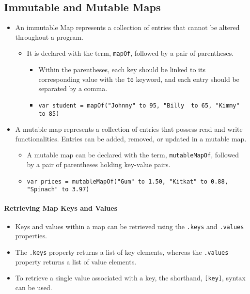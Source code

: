 \subsection{Immutable and Mutable Maps}
\begin{itemize}
    \item An immutable Map represents a collection of entries that cannot be altered throughout a program.
          \begin{itemize}
              \item It is declared with the term, \verb!mapOf!, followed by a pair of parentheses.
                    \begin{itemize}
                        \item Within the parentheses, each key should be linked to its corresponding value with the
                              \verb!to! keyword, and each entry should be separated by a comma.
                        \item \verb!var student = mapOf("Johnny" to 95, "Billy  to 65, "Kimmy" to 85)!
                    \end{itemize}
          \end{itemize}
\end{itemize}

\begin{itemize}
    \item A mutable map represents a collection of entries that possess read and write functionalities. 
    Entries can be added, removed, or updated in a mutable map.
    \begin{itemize}
        \item A mutable map can be declared with the term, \verb!mutableMapOf!, 
        followed by a pair of parentheses holding key-value pairs.
        \item \verb!var prices = mutableMapOf("Gum" to 1.50, "Kitkat" to 0.88, "Spinach" to 3.97)!
    \end{itemize}
\end{itemize}

\paragraph{Retrieving Map Keys and Values}
\begin{itemize}
    \item Keys and values within a map can be retrieved using the \verb!.keys! and \verb!.values! properties.
    \item The \verb!.keys! property returns a list of key elements, whereas the \verb!.values! property returns a list of value elements.
    \item To retrieve a single value associated with a key, the shorthand, \verb![key]!, syntax can be used.
\end{itemize}

